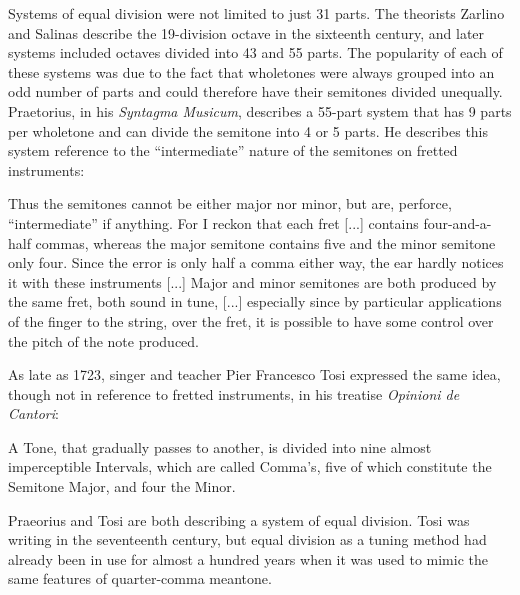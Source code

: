 Systems of equal division were not limited to just 31 parts.  The theorists Zarlino and Salinas describe the 19-division
octave in the sixteenth century, and later systems included octaves divided into 43
and 55 parts. The
popularity of each of these systems was due to the fact that wholetones were always
grouped into an odd number of parts and could therefore have their semitones divided
unequally. Praetorius,
in his \textit{Syntagma Musicum}, describes a 55-part system that has 9 parts per wholetone
and can divide the semitone into 4 or 5 parts.  He describes this system reference to the ``intermediate'' nature of the
semitones on fretted instruments:
\begin{blocks}
Thus the semitones cannot be either major nor minor, but are, perforce, ``intermediate''
if anything. For I reckon that each fret [...] contains four-and-a-half commas, whereas
the major semitone contains five and the minor semitone only four. Since the error is
only half a comma either way, the ear hardly notices it with these instruments [...]
Major and minor semitones are both produced by the same fret, both sound in tune, [...]
especially since by particular applications of the finger to the string, over the fret,
it is possible to have some control over the pitch of the note produced.
\autocite[68]{MP:1}
\end{blocks}
As late as 1723, singer and teacher Pier Francesco Tosi expressed the same idea, though
not in reference to fretted instruments, in his treatise \textit{Opinioni de Cantori}:
\begin{blocks}
A Tone, that gradually passes to another, is divided into nine almost imperceptible
Intervals, which are called Comma's, five of which constitute the Semitone Major, and four
the Minor.
\autocite[20]{PFT:1}
\end{blocks}
Praeorius and Tosi are both describing a system of equal division.  Tosi was writing in
the seventeenth century, but equal division as a tuning method had already been in use for
almost a hundred years when it was used to mimic the same features of quarter-comma
meantone.

